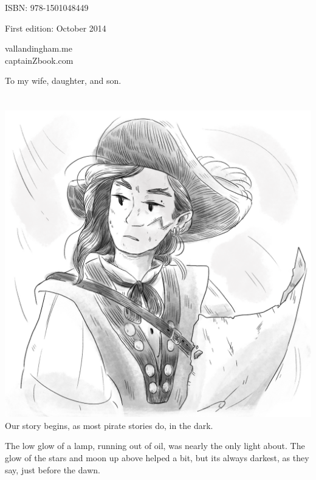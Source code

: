 \documentclass[12pt]{extbook}
\newcommand\blankpage{%
    \null
    \thispagestyle{empty}%
    \addtocounter{page}{-1}%
    \newpage}
\begin{document}
  ISBN: 978-1501048449

  First edition: October 2014

  \vfill
  vallandingham.me\\
  captainZbook.com
  \vspace*{2\baselineskip}
  \clearpage
  \endgroup

  \begingroup
  \vspace*{\fill}
  \begin{center}
  To my wife, daughter, and son.
  \end{center}
  \vspace*{\fill}
  \afterpage{\blankpage}
  \endgroup
  \setcounter{page}{0}
  \clearpage
  

  
  \pagestyle{fancy}

  \section{}\label{section}
  
  \includegraphics{img/captain_z.png}\\
   Our story begins, as most pirate stories do, in the dark.
  
  The low glow of a lamp, running out of oil, was nearly the only light
  about. The glow of the stars and moon up above helped a bit, but its
  always darkest, as they say, just before the dawn.
  
\end{document}

